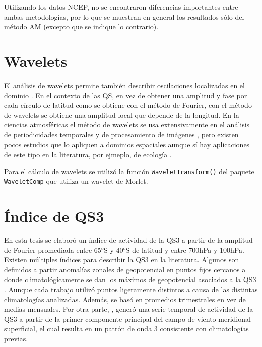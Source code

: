 \documentclass[spanish,a4paper,12pt,oneside]{book}
\begin{document}
Utilizando los datos NCEP, no se encontraron diferencias importantes
entre ambas metodologías, por lo que se muestran en general los
resultados sólo del método AM (excepto que se indique lo contrario).

\section*{Wavelets}

El análisis de wavelets permite también describir oscilaciones
localizadas en el dominio \autocite{Torrence1998}. En el contexto de las
QS, en vez de obtener una amplitud y fase por cada círculo de latitud
como se obtiene con el método de Fourier, con el método de wavelets se
obtiene una amplitud local que depende de la longitud. En la ciencias
atmosféricas el método de wavelets se usa extensivamente en el análisis
de periodicidades temporales \autocites[ej.][]{Raphael2004}{Kinnard2011}
y de procesamiento de imágenes \autocite[ej.][]{Desrochers1999}, pero
existen pocos estudios que lo apliquen a dominios espaciales
\autocite[ej.][]{Pinault2016} aunque sí hay aplicaciones de este tipo en
la literatura, por ejmeplo, de ecología \autocite[ej,][]{Mi2005}.

Para el cálculo de wavelets se utilizó la función
\texttt{WaveletTransform()} del paquete \texttt{WaveletComp}
\autocite{R-WaveletComp} que utiliza un wavelet de Morlet.

\section*{Índice de QS3}

En esta tesis se elaboró un índice de actividad de la QS3 a partir de la
amplitud de Fourier promediada entre 65°S y 40°S de latitud y entre
700hPa y 100hPa. Existen múltiples índices para describir la QS3 en la
literatura. Algunos son definidos a partir anomalías zonales de
geopotencial en puntos fijos cercanos a donde climatológicamente se dan
los máximos de geopotencial asociados a la QS3
\autocite[ej.][\textcite{Cai1999} y \textcite{Raphael2004}]{Mo1985}.
Aunque cada trabajo utilizó puntos ligeramente distintos a causa de las
distintas climatologías analizadas. Además, \textcite{Raphael2004} se
basó en promedios trimestrales en vez de medias mensuales. Por otra
parte, \textcite{Yuan2008}, generó una serie temporal de actividad de la
QS3 a partir de la primer componente principal del campo de viento
meridional superficial, el cual resulta en un patrón de onda 3
consistente con climatologías previas.
\end{document}
